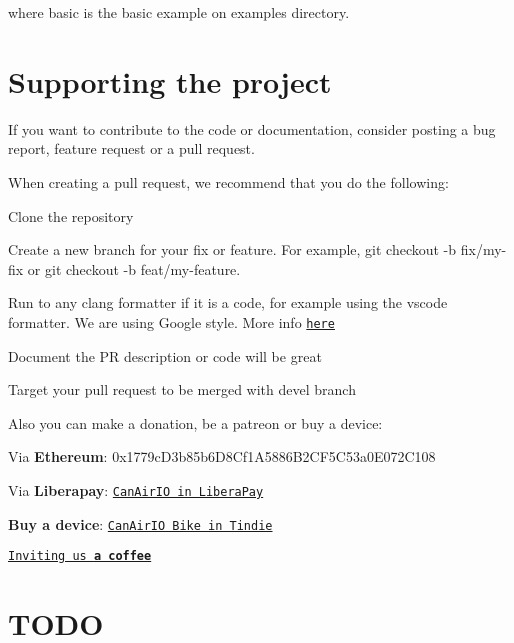 where {\ttfamily basic} is the basic example on examples directory.

\section*{Supporting the project}

If you want to contribute to the code or documentation, consider posting a bug report, feature request or a pull request.

When creating a pull request, we recommend that you do the following\+:


\begin{DoxyItemize}
\item Clone the repository
\item Create a new branch for your fix or feature. For example, git checkout -\/b fix/my-\/fix or git checkout -\/b feat/my-\/feature.
\item Run to any clang formatter if it is a code, for example using the {\ttfamily vscode} formatter. We are using Google style. More info \href{https://clang.llvm.org/docs/ClangFormatStyleOptions.html}{\tt here}
\item Document the PR description or code will be great
\item Target your pull request to be merged with {\ttfamily devel} branch
\end{DoxyItemize}

Also you can make a donation, be a patreon or buy a device\+:

\href{https://raw.githubusercontent.com/kike-canaries/canairio_firmware/master/images/ethereum_donation_address.png}{\tt }


\begin{DoxyItemize}
\item Via {\bfseries Ethereum}\+: {\ttfamily 0x1779c\+D3b85b6\+D8\+Cf1\+A5886\+B2\+C\+F5\+C53a0\+E072\+C108}
\item Via {\bfseries Liberapay}\+: \href{https://liberapay.com/CanAirIO}{\tt Can\+Air\+IO in Libera\+Pay}
\item {\bfseries Buy a device}\+: \href{https://www.tindie.com/products/hpsaturn/canairio-bike/}{\tt Can\+Air\+IO Bike in Tindie}
\item \href{https://www.buymeacoffee.com/hpsaturn}{\tt Inviting us {\bfseries a coffee}}
\end{DoxyItemize}

\section*{T\+O\+DO}


